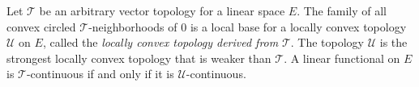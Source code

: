 Let $\mathcal{T}$ be an arbitrary vector topology for a linear space $E$. The family of all convex circled $\mathcal{T}$-neighborhoods of $0$ is a local base for a locally convex topology $\mathcal{U}$ on $E$, called the \emph{locally convex topology derived from} $\mathcal{T}$. The topology $\mathcal{U}$ is the strongest locally convex topology that is weaker than $\mathcal{T}$. A linear functional on $E$ is $\mathcal{T}$-continuous if and only if it is $\mathcal{U}$-continuous.
